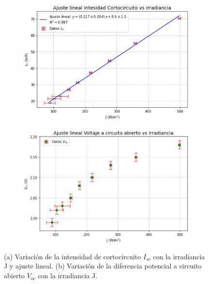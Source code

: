 \begin{figure}[H]
	\centering
	\begin{subfigure}{0.46\textwidth}
		\centering
		\includegraphics[width=\textwidth]{grafico04_ajuste_Isc_irradiancia.png}
		\caption{}\label{fig:a}
	\end{subfigure}\hspace{1cm} %
	\begin{subfigure}{0.46\textwidth}
		\centering
		\includegraphics[width=\textwidth]{grafico05_puntos_Voc_irradiancia.png}
		\caption{}\label{fig:b}
	\end{subfigure}
	\caption{(a) Variación de la intensidad de cortocircuito $I_{sc}$ con la irradiancia J y ajuste lineal. (b) Variación de la diferencia potencial a circuito abierto $V_{oc}$ con la irradiancia J.}
	\label{fig:Voc_Isc_J}
\end{figure}

